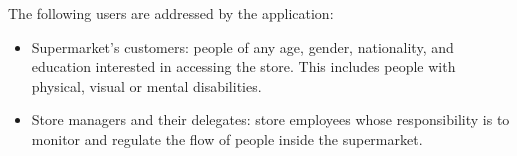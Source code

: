 \documentclass[../../main.tex]{subfiles}
\begin{document}
	The following users are addressed by the application:
	\begin{itemize}
		\item Supermarket's customers: people of any age, gender, nationality, and education interested in accessing the store. This includes people with physical, visual or mental disabilities.
		\item Store managers and their delegates: store employees whose responsibility is to monitor and regulate the flow of people inside the supermarket.
	\end{itemize}
\end{document}
